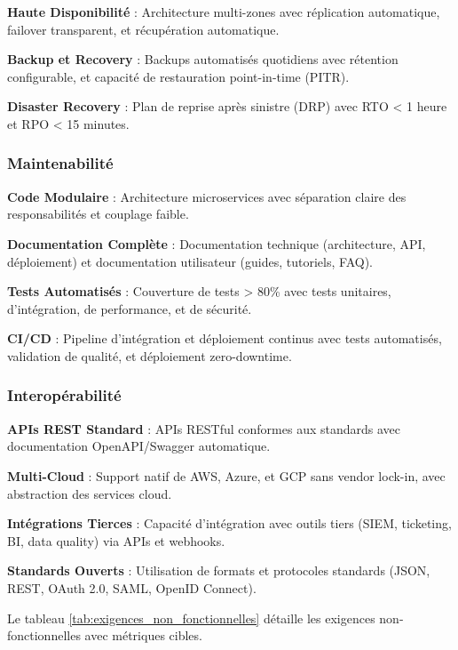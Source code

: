 \textbf{Haute Disponibilité} : Architecture multi-zones avec réplication automatique, failover transparent, et récupération automatique.

\textbf{Backup et Recovery} : Backups automatisés quotidiens avec rétention configurable, et capacité de restauration point-in-time (PITR).

\textbf{Disaster Recovery} : Plan de reprise après sinistre (DRP) avec RTO < 1 heure et RPO < 15 minutes.

\subsubsection{Maintenabilité}

\textbf{Code Modulaire} : Architecture microservices avec séparation claire des responsabilités et couplage faible.

\textbf{Documentation Complète} : Documentation technique (architecture, API, déploiement) et documentation utilisateur (guides, tutoriels, FAQ).

\textbf{Tests Automatisés} : Couverture de tests > 80\% avec tests unitaires, d'intégration, de performance, et de sécurité.

\textbf{CI/CD} : Pipeline d'intégration et déploiement continus avec tests automatisés, validation de qualité, et déploiement zero-downtime.

\subsubsection{Interopérabilité}

\textbf{APIs REST Standard} : APIs RESTful conformes aux standards avec documentation OpenAPI/Swagger automatique.

\textbf{Multi-Cloud} : Support natif de AWS, Azure, et GCP sans vendor lock-in, avec abstraction des services cloud.

\textbf{Intégrations Tierces} : Capacité d'intégration avec outils tiers (SIEM, ticketing, BI, data quality) via APIs et webhooks.

\textbf{Standards Ouverts} : Utilisation de formats et protocoles standards (JSON, REST, OAuth 2.0, SAML, OpenID Connect).

Le tableau \ref{tab:exigences_non_fonctionnelles} détaille les exigences non-fonctionnelles avec métriques cibles.

